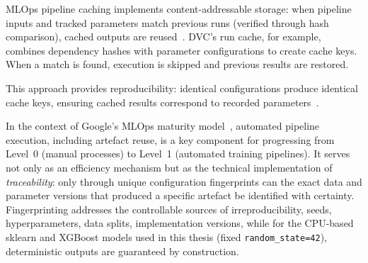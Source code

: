 MLOps pipeline caching implements content-addressable storage: when pipeline
inputs and tracked parameters match previous runs (verified through hash comparison),
cached outputs are reused~\cite{dvc_pipelines}. DVC's run cache,
for example, combines dependency hashes with parameter configurations to
create cache keys. When a match is found, execution is skipped and previous
results are restored.

This approach provides reproducibility: identical configurations produce
identical cache keys, ensuring cached results correspond to recorded
parameters~\cite{schubotz2022caching}.

In the context of Google's MLOps maturity model~\cite{googlemlops2023}, automated pipeline execution, including artefact reuse, is a key component for progressing from Level~0 (manual processes) to Level~1 (automated training pipelines). It serves not only as an efficiency mechanism but as the technical implementation of \textit{traceability}: only through unique configuration fingerprints can the exact data and parameter versions that produced a specific artefact be identified with certainty. Fingerprinting addresses the controllable sources of irreproducibility, seeds, hyperparameters, data splits, implementation versions, while for the CPU-based sklearn and XGBoost models used in this thesis (fixed \texttt{random\_state=42}), deterministic outputs are guaranteed by construction.
